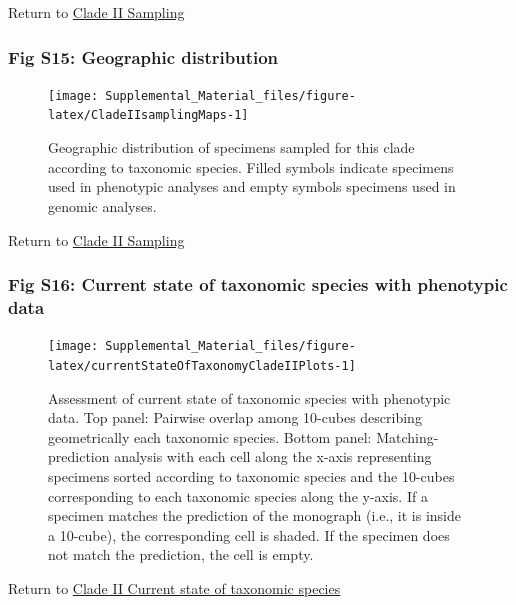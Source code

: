 \documentclass[
  11pt,
]{article}
\begin{document}
Return to \protect\hyperlink{sampling-2}{Clade II Sampling}
\pagebreak

\hypertarget{fig-s15-geographic-distribution}{%
\subsubsection{Fig S15: Geographic distribution}\label{fig-s15-geographic-distribution}}

\begin{figure}

{\centering \texttt{[image: Supplemental\_Material\_files/figure-latex/CladeIIsamplingMaps-1]} 

}

\caption{Geographic distribution of specimens sampled for this clade according to taxonomic species. Filled symbols indicate specimens used in phenotypic analyses and empty symbols specimens used in genomic analyses.}\label{fig:CladeIIsamplingMaps}
\end{figure}

Return to \protect\hyperlink{sampling-2}{Clade II Sampling}
\pagebreak

\hypertarget{fig-s16-current-state-of-taxonomic-species-with-phenotypic-data}{%
\subsubsection{Fig S16: Current state of taxonomic species with phenotypic data}\label{fig-s16-current-state-of-taxonomic-species-with-phenotypic-data}}

\begin{figure}
\texttt{[image: Supplemental\_Material\_files/figure-latex/currentStateOfTaxonomyCladeIIPlots-1]} \caption{Assessment of current state of taxonomic species with phenotypic data. Top panel: Pairwise overlap among 10-cubes describing geometrically each taxonomic species. Bottom panel: Matching-prediction analysis with each cell along the x-axis representing specimens sorted according to taxonomic species and the 10-cubes corresponding to each taxonomic species along the y-axis. If a specimen matches the prediction of the monograph (i.e., it is inside a 10-cube), the corresponding cell is shaded. If the specimen does not match the prediction, the cell is empty.}\label{fig:currentStateOfTaxonomyCladeIIPlots}
\end{figure}

Return to \protect\hyperlink{current-state-of-taxonomic-species-1}{Clade II Current state of taxonomic species}
\pagebreak
\end{document}
